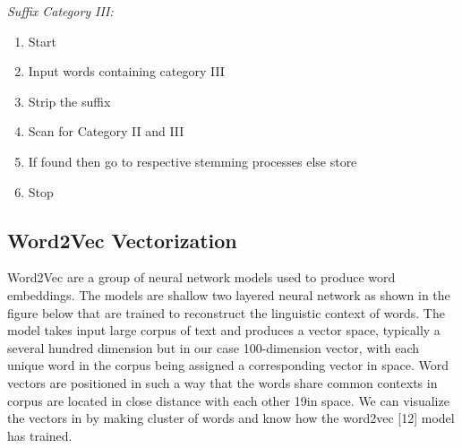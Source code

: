             \textit{Suffix Category III:}
            \begin{enumerate}
                \item Start
                \item Input words containing category III
                \item Strip the suffix
                \item Scan for Category II and III
                \item If found then go to respective stemming processes else store
                \item Stop
            \end{enumerate}
        \subsection{Word2Vec Vectorization}
Word2Vec are a group of neural network models used to produce word embeddings.
The models are shallow two layered neural network as shown in the figure below that
are trained to reconstruct the linguistic context of words. The model takes input large
corpus of text and produces a vector space, typically a several hundred dimension but
in our case 100-dimension vector, with each unique word in the corpus being assigned
a corresponding vector in space. Word vectors are positioned in such a way that the
words share common contexts in corpus are located in close distance with each other
19in space. We can visualize the vectors in by making cluster of words and know how the
word2vec [12] model has trained.

